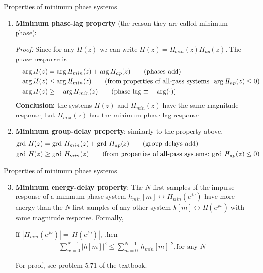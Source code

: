 \documentclass[10pt, handout]{beamer}
\begin{document}
\begin{frame}{Properties of minimum phase systems}
\begin{enumerate}
	\item \textbf{Minimum phase-lag property} (the reason they are called minimum phase):
	
	\textit{Proof:}
	Since for any $H(z)$ we can write $H(z) = H_{min}(z)H_{ap}(z)$. The phase response is
	\begin{align*}
	\arg H(z) &= \arg H_{min}(z) + \arg H_{ap}(z) \tag{phases add} \\
	\arg H(z) &\leq \arg H_{min}(z) \tag{from properties of all-pass systems: $\arg H_{ap}(z) \leq 0$} \\
	-\arg H(z) &\geq -\arg H_{min}(z) \tag{phase lag $\equiv -\arg(\cdot)$}
	\end{align*} 
	\pause
	\textbf{Conclusion:} the systems $H(z)$ and $H_{min}(z)$ have the same magnitude response, but $H_{min}(z)$ has the minimum phase-lag response.
	\pause
	\item \textbf{Minimum group-delay property}: similarly to the property above. 
	\begin{align*}
	\mathrm{grd}~H(z) &= \mathrm{grd}~  H_{min}(z) + \mathrm{grd}~  H_{ap}(z) \tag{group delays add} \\
	\mathrm{grd}~  H(z) &\geq \mathrm{grd}~  H_{min}(z) \tag{from properties of all-pass systems: $\mathrm{grd}~  H_{ap}(z) \leq 0$}
	\end{align*} 
\end{enumerate}

\end{frame}


\begin{frame}{Properties of minimum phase systems}
\begin{enumerate}\setcounter{enumi}{2}
	\item \textbf{Minimum energy-delay property}: The $N$ first samples of the impulse response of a minimum phase system $h_{min}[m] \leftrightarrow H_{min}(e^{j\omega})$ have more energy than the $N$ first samples of any other system $h[m]\leftrightarrow H(e^{j\omega})$ with same magnitude response. Formally,
	
	If $|H_{min}(e^{j\omega})| = |H(e^{j\omega})|$, then
	\begin{align*}
	\sum_{m = 0}^{N-1} |h[m]|^2 \leq \sum_{m = 0}^{N-1} |h_{min}[m]|^2, \text{for any $N$}
	\end{align*}
	
	For proof, see problem 5.71 of the textbook.	
\end{enumerate}
\end{frame}
\end{document}

